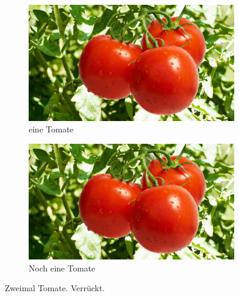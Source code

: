 \begin{figure}[h!]
  \centering
  \begin{subfigure}[b]{0.4\linewidth}
    \includegraphics[width=\linewidth]{fig/tomate.jpg}
    \caption{eine Tomate}
  \end{subfigure}
  \begin{subfigure}[b]{0.4\linewidth}
    \includegraphics[width=\linewidth]{fig/tomate.jpg}
    \caption{Noch eine Tomate}
  \end{subfigure}
  \caption{Zweimal Tomate. Verrückt.}
  \label{fig:tomaten}
\end{figure}
